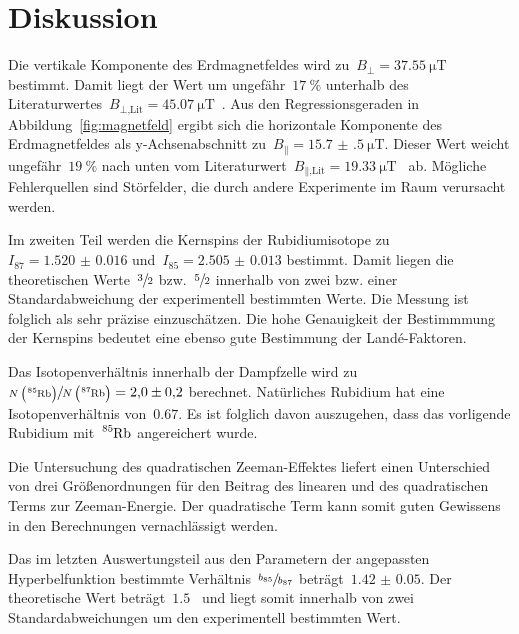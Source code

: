 \section{Diskussion}
\label{sec:diskussion}
%
Die vertikale Komponente des Erdmagnetfeldes wird
zu~$B_{\bot}=\SI{37.55}{\micro\tesla}$ bestimmt. Damit liegt der Wert um
ungefähr~$\SI{17}{\percent}$ unterhalb des
Literaturwertes~$B_{\bot\text{,Lit}}=\SI{45.07}{\micro\tesla}$~\cite{igrf}. Aus
den Regressionsgeraden in Abbildung~\ref{fig:magnetfeld} ergibt sich die
horizontale Komponente des Erdmagnetfeldes als y-Achsenabschnitt
zu~$B_{\parallel}=\SI{15.7(5)}{\micro\tesla}$. Dieser Wert weicht
ungefähr~$\SI{19}{\percent}$ nach unten vom
Literaturwert~$B_{\parallel\text{,Lit}}=\SI{19.33}{\micro\tesla}$~\cite{igrf}
ab. Mögliche Fehlerquellen sind Störfelder, die durch andere Experimente im Raum
verursacht werden.

Im zweiten Teil werden die Kernspins der Rubidiumisotope
zu~$I_{87}=\num{1.520(16)}$ und~$I_{85}=\num{2.505(13)}$ bestimmt. Damit liegen
die theoretischen Werte~$\sfrac{3}{2}$ bzw.~$\sfrac{5}{2}$ innerhalb von zwei
bzw. einer Standardabweichung der experimentell bestimmten Werte. Die Messung ist
folglich als sehr präzise einzuschätzen. Die hohe Genauigkeit der Bestimmmung
der Kernspins bedeutet eine ebenso gute Bestimmung der
Landé-Faktoren.

Das Isotopenverhältnis innerhalb der Dampfzelle wird
zu~$\sfrac{N\left(\ce{^85Rb}\right)}{N\left(\ce{^87Rb}\right)}=\num{2.0(2)}$
berechnet. Natürliches Rubidium hat eine Isotopenverhältnis von~$\num{0.67}$. Es
ist folglich davon auszugehen, dass das vorligende Rubidium mit~$\ce{^85Rb}$
angereichert wurde.

Die Untersuchung des quadratischen Zeeman-Effektes liefert einen Unterschied von
drei Größenordnungen für den Beitrag des linearen und des quadratischen Terms
zur Zeeman-Energie. Der quadratische Term kann somit guten Gewissens in den
Berechnungen vernachlässigt werden.

Das im letzten Auswertungsteil aus den Parametern der angepassten
Hyperbelfunktion bestimmte Verhältnis~$\sfrac{b_{85}}{b_{87}}$
beträgt~$\num{1.42(5)}$. Der theoretische Wert beträgt~$\num{1.5}$~\cite{V21}
und liegt somit innerhalb von zwei Standardabweichungen um den experimentell
bestimmten Wert.
